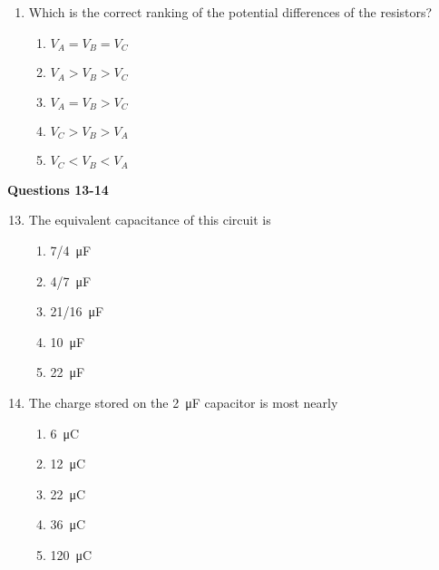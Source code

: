 \documentclass{../../oss-apphys}
\begin{document}
\begin{multicols}{2}
\begin{enumerate}[leftmargin=18pt]
  \item Which is the correct ranking of the potential differences of the
    resistors?
    \begin{enumerate}[noitemsep,topsep=0pt,leftmargin=18pt,label=(\Alph*)]
    \item $V_A = V_B = V_C$
    \item $V_A > V_B > V_C$
    \item $V_A = V_B > V_C$
    \item $V_C > V_B > V_A$
    \item $V_C < V_B < V_A$
    \end{enumerate}
  \end{enumerate}

  \columnbreak
  
  \textbf{Questions 13-14}

  \begin{center}
  \end{center}

  \begin{enumerate}[leftmargin=18pt]
    \setcounter{enumi}{12}
  \item The equivalent capacitance of this circuit is
    \begin{enumerate}[noitemsep,topsep=0pt,leftmargin=18pt,label=(\Alph*)]
    \item\SI{7/4}{\micro\farad}
    \item\SI{4/7}{\micro\farad}
    \item\SI{21/16}{\micro\farad}
    \item\SI{10}{\micro\farad}
    \item\SI{22}{\micro\farad}
    \end{enumerate}
    
  \item The charge stored on the \SI{2}{\micro\farad} capacitor is most nearly
    \begin{enumerate}[noitemsep,topsep=0pt,leftmargin=18pt,label=(\Alph*)]
    \item\SI{6}{\micro\coulomb}
    \item\SI{12}{\micro\coulomb}
    \item\SI{22}{\micro\coulomb}
    \item\SI{36}{\micro\coulomb}
    \item\SI{120}{\micro\coulomb}
    \end{enumerate}
    

\end{enumerate}
\end{multicols}
\end{document}
